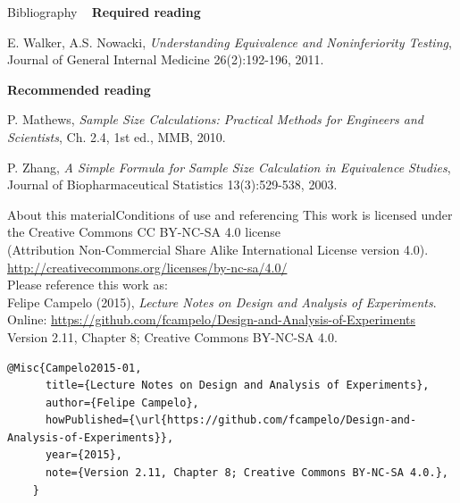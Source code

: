 \documentclass[t]{beamer}
\begin{document}

\begin{ftst}
{Bibliography}
{\ }
\scriptsize
\textbf{Required reading}

\benums  E. Walker, A.S. Nowacki, \textit{Understanding Equivalence and Noninferiority Testing}, Journal of General Internal Medicine 26(2):192-196, 2011.
\eenum

\textbf{Recommended reading}

\benums P. Mathews, \textit{Sample Size Calculations: Practical Methods for Engineers and Scientists}, Ch. 2.4, 1st ed., MMB, 2010.
\item P. Zhang, \textit{A Simple Formula for Sample Size Calculation in Equivalence Studies}, Journal of Biopharmaceutical Statistics 13(3):529-538, 2003.
\eenum
\end{ftst}


\begin{ftstf}{About this material}{Conditions of use and referencing}
\centering\footnotesize This work is licensed under the Creative Commons CC BY-NC-SA 4.0 license\\(Attribution Non-Commercial Share Alike International License version 4.0).\\
\vhalf
\url{http://creativecommons.org/licenses/by-nc-sa/4.0/}\\
\vone
\footnotesize Please reference this work as:\\
\footnotesize \flushleft Felipe Campelo (2015), \textit{Lecture Notes on Design and Analysis of Experiments}.\\Online: {\scriptsize\url{https://github.com/fcampelo/Design-and-Analysis-of-Experiments}}\\
Version 2.11, Chapter 8; Creative Commons BY-NC-SA 4.0.\\

\begin{Verbatim}[fontsize=\tiny]
    @Misc{Campelo2015-01,
      title={Lecture Notes on Design and Analysis of Experiments},
      author={Felipe Campelo},
      howPublished={\url{https://github.com/fcampelo/Design-and-Analysis-of-Experiments}},
      year={2015},
      note={Version 2.11, Chapter 8; Creative Commons BY-NC-SA 4.0.},
    }
\end{Verbatim}

\end{ftstf}
\end{document}
